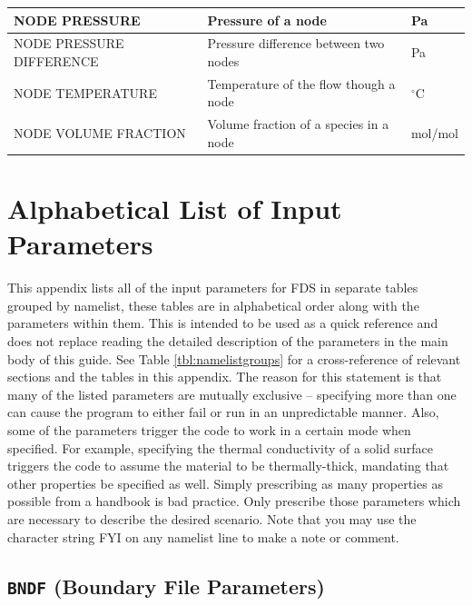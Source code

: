 \documentclass[11pt]{book}
\begin{document}
\begin{longtable}{|l|l|l|@{\extracolsep{\fill}}}
{\ct NODE PRESSURE}                             & Pressure of a node                        &       Pa              \\ \hline
{\ct NODE PRESSURE DIFFERENCE}                  & Pressure difference between two nodes     &       Pa              \\ \hline
{\ct NODE TEMPERATURE}                          & Temperature of the flow though a node     & $^\circ$C             \\ \hline
{\ct NODE VOLUME FRACTION}                      & Volume fraction of a species in a node    &  mol/mol              \\ \hline
\end{longtable}



\chapter{Alphabetical List of Input Parameters}

This appendix lists all of the input parameters for FDS in separate tables grouped by namelist, these tables are in alphabetical order along with the parameters within them. This is intended to be used as a quick reference and does not replace reading the detailed description of the parameters in the main body of this guide. See Table \ref{tbl:namelistgroups} for a cross-reference of relevant sections and the tables in this appendix. The reason for this statement is that many of the listed parameters are mutually exclusive -- specifying more than one can cause the program to either fail or run in an unpredictable manner. Also, some of the parameters trigger the code to work in a certain mode when specified. For example, specifying the thermal conductivity of a solid surface triggers the code to assume the material to be thermally-thick, mandating that other
properties be specified as well. Simply prescribing as many properties as possible from a handbook is bad practice. Only prescribe those parameters which are necessary to describe the desired scenario. Note that you may use the character string {\ct FYI} on any namelist line to make a note or comment.


\clearpage


\section{\texorpdfstring{{\tt BNDF}}{BNDF} (Boundary File Parameters)}
\end{document}
